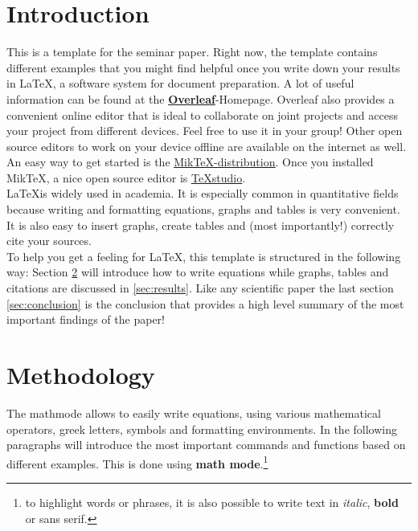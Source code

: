 \documentclass[12pt]{article}
\begin{document}

\onehalfspacing                  	

\section{Introduction}
This is a template for the seminar paper. Right now, the template contains different examples that you might find helpful once you write down your results in \LaTeX, a software system for document preparation. A lot of useful information can be found at the \href{https://www.overleaf.com/learn/latex/Creating_a_document_in_LaTeX}{\textbf{Overleaf}}-Homepage. Overleaf also provides a convenient online editor that is ideal to collaborate on joint projects and access your project from different devices. Feel free to use it in your group! Other open source editors to work on your device offline are available on the internet as well. An easy way to get started is the \href{https://miktex.org/download}{\underline{MikTeX-distribution}}. Once you installed MikTeX, a nice open source editor is \href{https://www.texstudio.org/}{\underline{TeXstudio}}. \\
\LaTeX is widely used in academia. It is especially common in quantitative fields because writing and formatting equations, graphs and tables is very convenient. It is also easy to insert graphs, create tables and (most importantly!) correctly cite your sources. \\
To help you get a feeling for \LaTeX, this template is structured in the following way: Section \ref{sec:math_mode} will introduce how to write equations while graphs, tables and citations are discussed in \ref{sec:results}. Like any scientific paper the last section \ref{sec:conclusion} is the conclusion that provides a high level summary of the most important findings of the paper!

\section{Methodology}\label{sec:math_mode}
The mathmode allows to easily write equations, using various mathematical operators, greek letters, symbols and formatting environments. In the following paragraphs will introduce the most important commands and functions based on different examples. This is done using \textbf{math mode}.\footnote{to highlight words or phrases, it is also possible to write text in \textit{italic}, \textbf{bold} or \textsf{sans serif}.}
\end{document}
